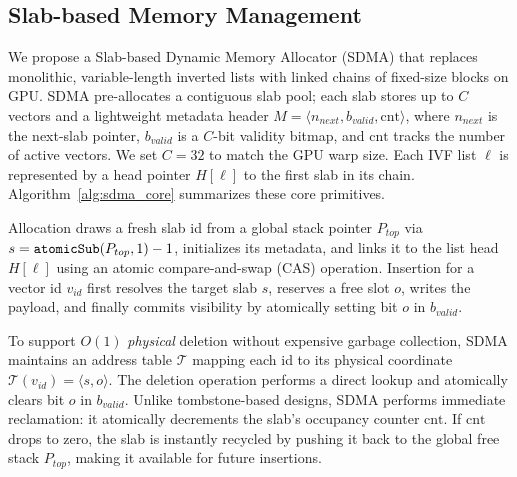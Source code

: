 \documentclass[sigconf,nonacm]{acmart}
\theoremstyle{plain}
\theoremstyle{definition}
\theoremstyle{remark}
\begin{document}
\subsection{Slab-based Memory Management}
\label{sec:slab_memory_management}

We propose a Slab-based Dynamic Memory Allocator (SDMA) that replaces monolithic, variable-length inverted lists with linked chains of fixed-size blocks on GPU. SDMA pre-allocates a contiguous slab pool; each slab stores up to $C$ vectors and a lightweight metadata header $M=\langle n_{next}, b_{valid}, \text{cnt} \rangle$, where $n_{next}$ is the next-slab pointer, $b_{valid}$ is a $C$-bit validity bitmap, and $\text{cnt}$ tracks the number of active vectors. We set $C=32$ to match the GPU warp size. Each IVF list $\ell$ is represented by a head pointer $H[\ell]$ to the first slab in its chain. Algorithm~\ref{alg:sdma_core} summarizes these core primitives.

Allocation draws a fresh slab id from a global stack pointer $P_{top}$ via $s=\textnormal{\texttt{atomicSub}}(P_{top},1)-1$, initializes its metadata, and links it to the list head $H[\ell]$ using an atomic compare-and-swap (CAS) operation. Insertion for a vector id $v_{id}$ first resolves the target slab $s$, reserves a free slot $o$, writes the payload, and finally commits visibility by atomically setting bit $o$ in $b_{valid}$.

To support $O(1)$ \textit{physical} deletion without expensive garbage collection, SDMA maintains an address table $\mathcal{T}$ mapping each id to its physical coordinate $\mathcal{T}(v_{id})=\langle s,o\rangle$. The deletion operation performs a direct lookup and atomically clears bit $o$ in $b_{valid}$. Unlike tombstone-based designs, SDMA performs immediate reclamation: it atomically decrements the slab's occupancy counter $\text{cnt}$. If $\text{cnt}$ drops to zero, the slab is instantly recycled by pushing it back to the global free stack $P_{top}$, making it available for future insertions. 
\end{document}
